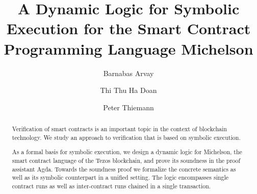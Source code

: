 \documentclass[a4paper,USenglish,cleveref,autoref,anonymous]{lipics-v2021}
\title{A Dynamic Logic for Symbolic Execution for the Smart Contract Programming Language Michelson}
\author{Barnabas Arvay}{University of Freiburg, Germany}{barnabasarvay@gmail.com}{https://orcid.org/0009-0002-2720-7100}{}%
\author{Thi Thu Ha Doan}{University of Freiburg,
  Germany}{doanha@informatik.uni-freiburg.de}{https://orcid.org/0000−0001−7524−4497}{Supported
  by the Tezos Foundation, grant COOC}
\author{Peter Thiemann}{University of Freiburg, Germany}{thiemann@informatik.uni-freiburg.de}{https://orcid.org/0000−0002−9000−1239}{}
\begin{document}
\maketitle

\begin{abstract}
Verification of smart contracts is an important topic in the context
of blockchain technology. We study an approach to verification that is
based on symbolic execution. 

As a formal basis for symbolic execution, we design a dynamic logic
for Michelson, the smart contract language of the Tezos blockchain,
and prove its soundness in the proof assistant Agda. Towards the
soundness proof we formalize the concrete semantics as well as its
symbolic counterpart in a unified setting. The logic encompasses
single contract runs as well as inter-contract runs chained in a single transaction. 
\end{abstract}









\end{document}
